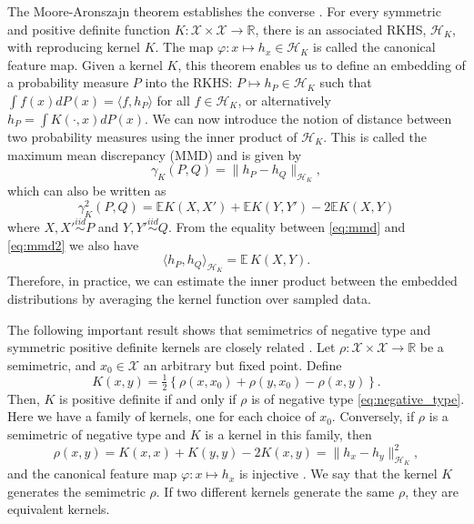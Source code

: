 \documentclass{article}
\newcommand\E{\mathbb{E}}
\newcommand\kk{K}
\newcommand\kkk{h}
\newcommand\Hk{{\mathcal{H}}_{\kk}}
\begin{document}
The Moore-Aronszajn theorem establishes the converse \cite{Aronszajn}.
For every symmetric
and positive definite function $\kk: \mathcal{X}\times \mathcal{X} \to
\mathbb{R}$, there is an associated RKHS, $\Hk$, 
with reproducing
kernel $\kk$. The map $\varphi: x \mapsto \kkk_x \in \Hk$ is called
the canonical feature map. Given a kernel $\kk$,
this theorem enables us to define an embedding of a probability measure
$P$ into the RKHS: $P \mapsto \kkk_P \in
\Hk$ such that 
$\int f(x) d P(x) = \langle f, \kkk_P \rangle$ for all $f \in \Hk$,
or alternatively $\kkk_P = \int \kk(\cdot, x)  d P(x)$. 
We can now  introduce the 
notion of distance between two probability measures using the inner product
of $\Hk$. This is called the maximum mean discrepancy (MMD) and
is given by
\begin{equation}\label{eq:mmd}
\gamma_\kk(P,Q) = \| \kkk_P - \kkk_Q \|_{\Hk},
\end{equation}
which can also be written as \cite{Gretton2012}
\begin{equation}\label{eq:mmd2}
\gamma_\kk^2(P,Q) = \E \kk(X,X') + \E \kk(Y,Y') - 2 \E \kk(X, Y)
\end{equation}
where $X,X' \stackrel{iid}{\sim} P$ and $Y,Y'\stackrel{iid}{\sim} Q$.
From the equality between \eqref{eq:mmd} and \eqref{eq:mmd2} we also
have 
\begin{equation}\label{eq:inner_data}
\langle \kkk_P, \kkk_Q \rangle_{\Hk} = \E \, \kk(X, Y).
\end{equation}
Therefore, in practice, we can estimate the inner product between the 
embedded distributions 
by averaging the kernel function over sampled data.

The following important result shows that semimetrics of negative
type and symmetric positive definite kernels are closely related
\cite{Berg1984}. Let $\rho: \mathcal{X} \times \mathcal{X} \to \mathbb{R}$
be a semimetric, 
and $x_0 \in \mathcal{X}$ an arbitrary but fixed point.
Define
\begin{equation}
\label{eq:kernel_semimetric}
\kk(x,y) = \tfrac{1}{2} \left\{  \rho(x,x_0) + \rho(y,x_0) - \rho(x,y)\right\}.
\end{equation}
Then, $\kk$ is positive definite if and only if $\rho$ is of negative type
\eqref{eq:negative_type}.
Here we have a family of kernels, one for each choice of $x_0$. Conversely,
if $\rho$ is a semimetric of negative type and $\kk$ is a kernel in this
family, then 
\begin{equation}
\label{eq:gen_kernel}
\rho(x,y) = \kk(x,x) + \kk(y,y) -2\kk(x,y) = \| \kkk_x - \kkk_y
\|^2_{\Hk},
\end{equation}
and the canonical feature map 
$\varphi: x \mapsto \kkk_x$ is injective \cite{Sejdinovic2013}.
We say that the kernel $\kk$ generates the semimetric $\rho$. 
If two different kernels generate the same $\rho$, they are
equivalent kernels.
\end{document}
